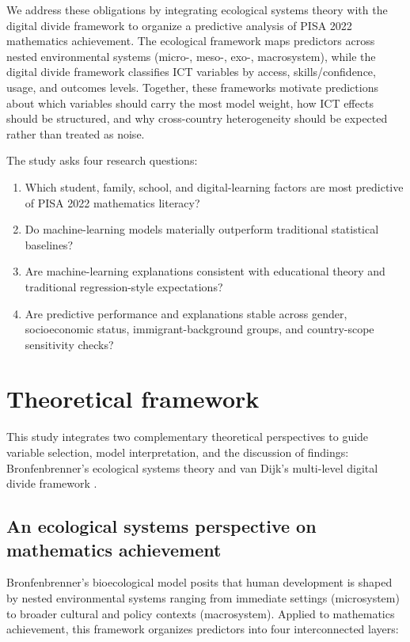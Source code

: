 \documentclass[pdflatex,sn-mathphys-ay]{sn-jnl}
\begin{document}
We address these obligations by integrating ecological systems theory \citep{Bronfenbrenner_1979} with the digital divide framework to organize a predictive analysis of PISA 2022 mathematics achievement. The ecological framework maps predictors across nested environmental systems (micro-, meso-, exo-, macrosystem), while the digital divide framework classifies ICT variables by access, skills/confidence, usage, and outcomes levels. Together, these frameworks motivate predictions about which variables should carry the most model weight, how ICT effects should be structured, and why cross-country heterogeneity should be expected rather than treated as noise.

The study asks four research questions:

\begin{enumerate}
\item Which student, family, school, and digital-learning factors are most predictive of PISA 2022 mathematics literacy?
\item Do machine-learning models materially outperform traditional statistical baselines?
\item Are machine-learning explanations consistent with educational theory and traditional regression-style expectations?
\item Are predictive performance and explanations stable across gender, socioeconomic status, immigrant-background groups, and country-scope sensitivity checks?
\end{enumerate}

\section{Theoretical framework}

This study integrates two complementary theoretical perspectives to guide variable selection, model interpretation, and the discussion of findings: Bronfenbrenner's ecological systems theory \citep{Bronfenbrenner_1979,Bronfenbrenner_1994} and van Dijk's multi-level digital divide framework \citep{van_Dijk_2005,van_Dijk_2020}.

\subsection{An ecological systems perspective on mathematics achievement}

Bronfenbrenner's bioecological model posits that human development is shaped by nested environmental systems ranging from immediate settings (microsystem) to broader cultural and policy contexts (macrosystem). Applied to mathematics achievement, this framework organizes predictors into four interconnected layers:
\end{document}
